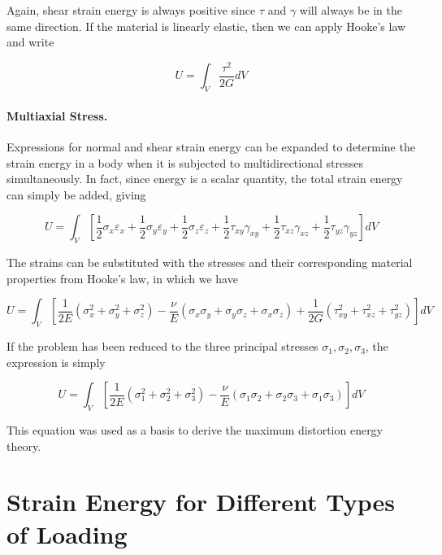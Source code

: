 \documentclass[
10pt,
a4paper,
openany,
svgnames,
]{book} %
\begin{document}
Again, shear strain energy is always positive since $\tau$ and $\gamma$ will always be in the same direction. If the material is linearly elastic, then we can apply Hooke's law and write

\begin{equation}
  U = \int_V \frac{\tau^2}{2G} dV
\end{equation}

\paragraph{Multiaxial Stress.}

Expressions for normal and shear strain energy can be expanded to determine the strain energy in a body when it is subjected to multidirectional stresses simultaneously. In fact, since energy is a scalar quantity, the total strain energy can simply be added, giving

\begin{equation}
  U = \int_V \left[ \frac{1}{2}\sigma_x \varepsilon_x + \frac{1}{2}\sigma_y \varepsilon_y + \frac{1}{2}\sigma_z \varepsilon_z + \frac{1}{2}\tau_{xy} \gamma_{xy} + \frac{1}{2}\tau_{xz} \gamma_{xz} + \frac{1}{2}\tau_{yz} \gamma_{yz}\right] dV
\end{equation}

The strains can be substituted with the stresses and their corresponding material properties from Hooke's law, in which we have

\begin{equation}
  U = \int_V \left[ \frac{1}{2E} \left( \sigma_x^2 + \sigma_y^2 + \sigma_z^2 \right) - \frac{\nu}{E} \left( \sigma_x \sigma_y + \sigma_y \sigma_z + \sigma_x \sigma_z \right) + \frac{1}{2G} \left( \tau_{xy}^2 + \tau_{xz}^2 + \tau_{yz}^2 \right) \right] dV
\end{equation}

If the problem has been reduced to the three principal stresses $\sigma_1, \sigma_2, \sigma_3$, the expression is simply

\begin{equation}
  U = \int_V \left[ \frac{1}{2E} \left( \sigma_1^2 + \sigma_2^2 + \sigma_3^2 \right) - \frac{\nu}{E} \left( \sigma_1 \sigma_2 + \sigma_2 \sigma_3 + \sigma_1 \sigma_3 \right) \right] dV
\end{equation}

This equation was used as a basis to derive the maximum distortion energy theory.

\section{Strain Energy for Different Types of Loading}
\end{document}
